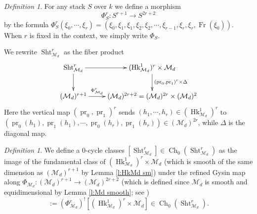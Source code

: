 \documentclass[reqno]{amsart}
\numberwithin{equation}{section}
\newcommand\mnote[1]{\marginpar{\tiny #1}}
\DeclareMathOperator{\Frob}{Fr}
\DeclareMathOperator{\Sht}{Sht}
\DeclareMathOperator{\pr}{pr}
\DeclareMathOperator{\Hk}{Hk}
\DeclareMathOperator{\Ch}{Ch}
\newcommand\cM{\mathcal{M}}
\theoremstyle{remark}
\newtheorem{defn}[thm]{Definition}
\numberwithin{equation}{section}
\begin{document}

\begin{defn}\label{def:Phi} For any stack $S$ over $k$ we define a morphism
\begin{equation}
\Phi^{r}_{S}: S^{r+1}\to S^{2r+2}
\end{equation}
by the formula $\Phi^{r}_{S}(\xi_{0},\cdots, \xi_{r})=(\xi_{0},\xi_{1},\xi_{1},\xi_{2},\xi_{2},\cdots, \xi_{r-1}, \xi_r, \xi_r, \Frob(\xi_{0}))$. When $r$ is fixed in the context, we simply write $\Phi_{S}$.
\end{defn}

We rewrite $\Sht^{r}_{\cM_{d}}$ as the fiber product
\begin{equation}\label{rewrite ShtM}
\xymatrix{\Sht^{r}_{\cM_{d}} \ar[r]\ar[d] & (\Hk^{1}_{\cM_{d}})^{r}\ar[d]^{(\pr_{0},\pr_{1})^{r} \times \Delta} \times \cM_d\\
(\cM_{d})^{r+1}\ar[r]^-{\Phi^{r}_{\cM_{d}}} & (\cM_{d})^{2r+2}=(\cM_{d})^{2r}\times(\cM_{d})^{2}}
\end{equation}
Here the vertical map $(\pr_{0},\pr_{1})^{r}$ sends $(h_{1},\cdots, h_{r})\in (\Hk^{1}_{\cM_{d}})^{r} $ to 
$(\pr_{0}(h_{1}), \pr_{1}(h_{1}),\cdots, \pr_{0}(h_{r}),\pr_{1}(h_{r}))\in (\cM_{d})^{2r}$, while $\Delta$ is the diagonal map. 

\begin{defn}\label{def: hitchin shtukas class} We define a $0$-cycle classes $[\Sht^{r}_{\cM_{d}}]\in \Ch_{0}(\Sht^{r}_{\cM_{d}})$ as the image of the fundamental class of $(\Hk^{1}_{\cM_{d}})^{r} \times \cM_d$  (which is smooth of the same dimension as $(\cM_{d})^{r+1}$ by Lemma \ref{l:HkMd sm}) under the refined  Gysin map along $\Phi_{\cM_{d}}:(\cM_{d})^{r+1}\to (\cM_{d})^{2r+2}$ (which is defined since $\cM_{d}$ is smooth and equidimensional by Lemma \ref{l:Md smooth}; see \cite[Theorem 2.1.12(xi)]{Kr99}) 
\begin{equation}
[\Sht^{r}_{\cM_{d}}]:=(\Phi^{r}_{\cM_{d}})^{!}[(\Hk^{1}_{\cM_{d}})^{r} \times \cM_d]\in \Ch_{0}(\Sht^{r}_{\cM_{d}}).
\end{equation}
\end{defn}
\end{document}
